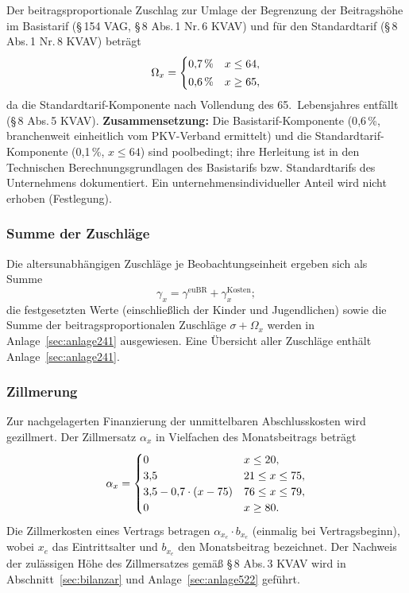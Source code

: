 Der beitragsproportionale Zuschlag zur Umlage der Begrenzung der
Beitragshöhe im Basistarif (\S\,154 VAG, \S\,8 Abs.\,1 Nr.\,6 KVAV)
und für den Standardtarif (\S\,8 Abs.\,1 Nr.\,8 KVAV) beträgt
\begin{equation}
\Omega_x = \begin{cases}
0{,}7\,\% & x \le 64,\\[2pt]
0{,}6\,\% & x \ge 65,
\end{cases}
\label{eq:omegaz}
\end{equation}
da die Standardtarif-Komponente nach Vollendung des 65.~Lebensjahres
entfällt (\S\,8 Abs.\,5 KVAV). \textbf{Zusammensetzung:} Die
Basistarif-Komponente (0{,}6\,\%, branchenweit einheitlich vom
PKV-Verband ermittelt) und die Standardtarif-Komponente (0{,}1\,\%,
$x \le 64$) sind poolbedingt; ihre Herleitung ist in den Technischen
Berechnungsgrundlagen des Basistarifs bzw. Standardtarifs des
Unternehmens dokumentiert. Ein unternehmensindividueller Anteil wird
nicht erhoben (Festlegung).

\subsubsection{Summe der Zuschläge}\label{sec:zuschlagsumme}

Die altersunabhängigen Zuschläge je Beobachtungseinheit ergeben sich
als Summe
\begin{equation}
\gamma_x = \gamma^{\mathrm{euBR}} + \gamma^{\mathrm{Kosten}}_x;
\label{eq:gammasumme}
\end{equation}
die festgesetzten Werte (einschließlich der Kinder und Jugendlichen)
sowie die Summe der beitragsproportionalen Zuschläge
$\sigma + \Omega_x$ werden in Anlage~\ref{sec:anlage241}
ausgewiesen. Eine Übersicht aller Zuschläge enthält Anlage~\ref{sec:anlage241}.

\subsubsection{Zillmerung}\label{sec:zillmerung}

Zur nachgelagerten Finanzierung der unmittelbaren Abschlusskosten wird
gezillmert. Der Zillmersatz $\alpha_x$ in Vielfachen des
Monatsbeitrags beträgt
\begin{equation}
\alpha_x = \begin{cases}
0 & x \le 20,\\
3{,}5 & 21 \le x \le 75,\\
3{,}5 - 0{,}7\cdot(x-75) & 76 \le x \le 79,\\
0 & x \ge 80.
\end{cases}
\label{eq:zillmer}
\end{equation}
Die Zillmerkosten eines Vertrags betragen $\alpha_{x_e}\cdot b_{x_e}$
(einmalig bei Vertragsbeginn), wobei $x_e$ das Eintrittsalter und
$b_{x_e}$ den Monatsbeitrag bezeichnet. Der Nachweis der zulässigen
Höhe des Zillmersatzes gemäß \S\,8 Abs.\,3 KVAV wird in
Abschnitt~\ref{sec:bilanzar} und Anlage~\ref{sec:anlage522} geführt.
